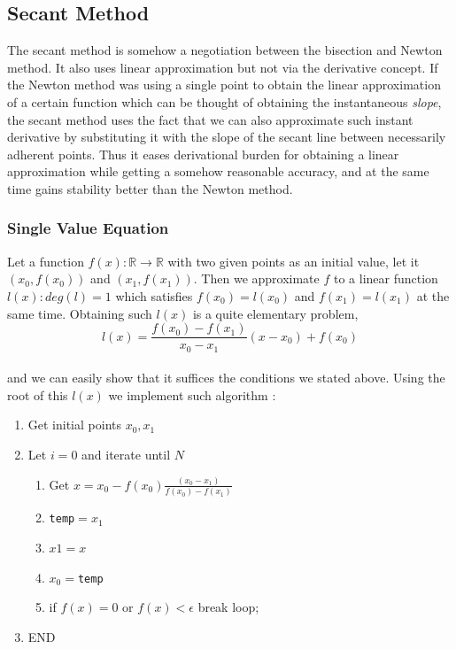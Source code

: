 \documentclass[paper=a4, fontsize=11pt]{scrartcl}
\begin{document}
\subsection{Secant Method}
\vspace{0.15in}
The secant method is somehow a negotiation between the bisection and Newton method. It also uses linear approximation but not via the derivative concept. If the Newton method was using a single point to obtain the linear approximation of a certain function which can be thought of obtaining the instantaneous \textit{slope}, the secant method uses the fact that we can also approximate such instant derivative by substituting it with the slope of the secant line between necessarily adherent points. Thus it eases derivational burden for obtaining a linear approximation while getting a somehow reasonable accuracy, and at the same time gains stability better than the Newton method. \\

\vspace{0.15in}
\subsubsection{Single Value Equation}
\vspace{0.15in}

Let a function $f(x):\mathbb{R}\to\mathbb{R}$ with two given points as an initial value, let it $(x_0,f(x_0))$ and $(x_1, f(x_1))$. Then we approximate $f$ to a linear function $l(x): deg(l)=1$ which satisfies $f(x_0)=l(x_0)$ and $f(x_1)=l(x_1)$ at the same time. Obtaining such $l(x)$ is a quite elementary problem, \\

\begin{equation}\nonumber
	l(x) = \frac{f(x_0)-f(x_1)}{x_0 - x_1}(x-x_0)+ f(x_0)
\end{equation}\\

and we can easily show that it suffices the conditions we stated above. Using the root of this $l(x)$ we implement such algorithm :

\begin{enumerate}[label=\arabic*)]
	\item Get initial points $x_0,x_1$
	\item Let $i=0$ and iterate until $N$
	\begin{enumerate}[label=(\arabic*)]
		\item Get $x = x_0 - f(x_0)\frac{(x_0-x_1)}{f(x_0)-f(x_1)}$
		\item \texttt{temp}$= x_1$
		\item $x1=x$
		\item $x_0=$\texttt{temp}
		\item if $f(x)=0$ or $f(x) < \epsilon$ break loop;
	\end{enumerate}
	\item END
\end{enumerate} 
\end{document}
